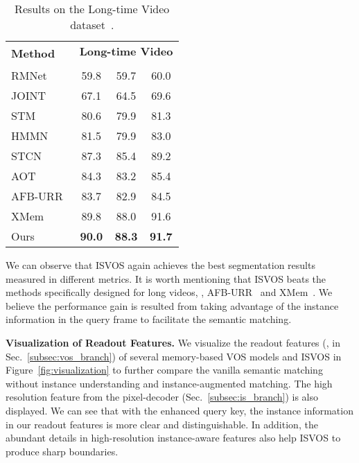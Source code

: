 \documentclass[10pt,twocolumn,letterpaper]{article}
\newcommand{\system}{ISVOS\xspace}
\begin{document}
\begin{table}[!ht]
\centering
  \setlength{\tabcolsep}{0pt}
  \begin{tabular*}{0.9\linewidth}{@{\extracolsep{\fill}}l | ccc }
    \toprule
    \multirow{2}{1in}{\textbf{Method}} & \multicolumn{3}{c}{\textbf{Long-time Video}}  \\
    ~ &  &  &  \\
    \midrule
    RMNet~\cite{xie2021efficient} & 59.8 & 59.7 & 60.0 \\
    JOINT~\cite{mao2021joint} & 67.1 & 64.5 & 69.6 \\
    STM~\cite{oh2019video} & 80.6 & 79.9 & 81.3 \\ 
    HMMN~\cite{shi2015hierarchical} & 81.5 & 79.9 & 83.0 \\
    STCN~\cite{cheng2021stcn} & 87.3 & 85.4 & 89.2  \\
    AOT~\cite{yang2021associating} & 84.3 & 83.2 & 85.4 \\
    AFB-URR~\cite{liang2020video} & 83.7 & 82.9 &  84.5 \\
    XMem~\cite{cheng2022xmem} & 89.8 & 88.0 & 91.6 \\
    Ours & \textbf{90.0} & \textbf{88.3} & \textbf{91.7} \\
    \bottomrule
  \end{tabular*}
 \caption{Results on the Long-time Video dataset~\cite{liang2020video}. }
\label{tab:long}
\end{table}

We can observe that \system again achieves the best segmentation results measured in different metrics. It is worth mentioning that \system beats the methods specifically designed for long videos, \eg, AFB-URR~\cite{liang2020video} and XMem~\cite{cheng2022xmem}. We believe the performance gain is resulted from taking advantage of the instance information in the query frame to facilitate the semantic matching.

\vspace{0.05in}
\noindent \textbf{Visualization of Readout Features.} We visualize the readout features (\ie,  in Sec.~\ref{subsec:vos_branch}) of several memory-based VOS models and \system in Figure~\ref{fig:visualization} to further compare the vanilla semantic matching without instance understanding and instance-augmented matching. The high resolution feature  from the pixel-decoder (Sec.~\ref{subsec:is_branch}) is also displayed. We can see that with the enhanced query key, the instance information in our readout features is more clear and distinguishable. In addition, the abundant details in high-resolution instance-aware features also help \system to produce sharp boundaries.
\end{document}
